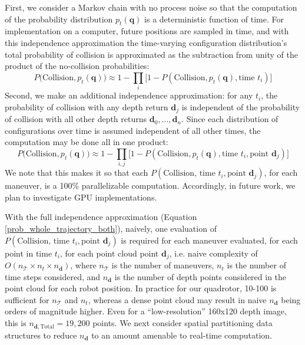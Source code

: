 \documentclass{llncs}
\begin{document}
First, we consider a Markov chain with no process noise so that the computation of the probability distribution $p_t(\mathbf{q})$ is a deterministic function of time. For implementation on a computer, future positions are sampled in time, and with this independence approximation the time-varying configuration distribution's total probability of collision is approximated as the subtraction from unity of the product of the no-collision probabilities:
%
\begin{equation}
    \label{prob_whole_trajectory}
    P \big( \text{Collision}, p_t( \mathbf{q}) \big) \approx   1 -   \prod_{i} \big[1 - P(\text{Collision}, p_t( \mathbf{q}) , \text{time } t_i) \big] 
\end{equation}
%
Second, we make an additional independence approximation: for any $t_i$,  the probability of collision with any depth return $\mathbf{d}_j$ is independent of the probability of collision with all other depth returns $\mathbf{d}_0, ..., \mathbf{d}_n$.  Since each distribution of configurations over time is assumed independent of all other times, the computation may be done all in one product:
%
\begin{equation}
    \label{prob_whole_trajectory_both}
        P \big( \text{Collision},  p_t( \mathbf{q}) \big) \approx   1 -   \prod_{i, j} \big[1 - P(\text{Collision},  p_t( \mathbf{q}), \text{time } t_i, \text{point } \mathbf{d}_j) \big] 
\end{equation}
%
We note that this makes it so that each $P(\text{Collision, time } t_i, \text{point }  \mathbf{d}_j)$, for each maneuver, is a 100\% parallelizable computation.  Accordingly, in future work, we plan to investigate GPU implementations.

With the full independence approximation (Equation \ref{prob_whole_trajectory_both}), naively, one evaluation of $P(\text{Collision, time } t_i, \text{point }  \mathbf{d}_j)$ is required for each maneuver evaluated, for each point in time $t_i$, for each point cloud point $\mathbf{d}_j$, i.e. naive complexity of $O( n_{\mathcal{T}} \times n_{t} \times n_{\mathbf{d}})$, where $n_{\mathcal{T}}$ is the number of maneuvers, $n_{t}$ is the number of time steps considered, and $n_{\mathbf{d}}$ is the number of depth points considered in the point cloud for each robot position.  In practice for our quadrotor, 10-100 is sufficient for $n_{\mathcal{T}}$ and $n_{t}$, whereas a dense point cloud may result in naive $n_{\mathbf{d}}$ being orders of magnitude higher.  Even for a ``low-resolution'' 160x120 depth image, this is $n_{\mathbf{d}, \text{Total}}=19,200$ points.  We next consider spatial partitioning data structures to reduce $n_{\mathbf{d}}$ to an amount amenable to real-time computation.
\end{document}
